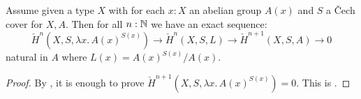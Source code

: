 \begin{lemma}\label{inductive-definition-cech-cohomology-general}
Assume given a type $X$ with for each $x:X$ an abelian group $A(x)$ and $S$ a \v{C}ech cover for $X,A$. Then for all $n:\mathbb{N}$ we have an exact sequence:
\[\check{H}^{n}(X,S,\lambda x.\, A(x)^{S(x)}) \to \check{H}^{n}(X,S,L)\to \check{H}^{n+1}(X,S,A)\to 0\]
natural in $A$ where $L(x)=A(x)^{S(x)}/A(x)$.
\end{lemma}

\begin{proof}
By , it is enough to prove $\check{H}^{n+1}(X,S,\lambda x.\, A(x)^{S(x)}) = 0$. 
This is .
\end{proof}
%
